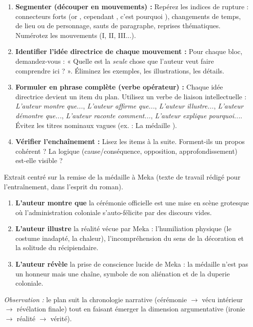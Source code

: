 \documentclass[11pt]{article}
\begin{document}
\begin{methode}
\begin{enumerate}
    \item \textbf{Segmenter (découper en mouvements) :} Repérez les indices de rupture : connecteurs forts (\og or \fg{}, \og cependant \fg{}, \og c'est pourquoi \fg{}), changements de temps, de lieu ou de personnage, sauts de paragraphe, reprises thématiques. Numérotez les mouvements (I, II, III...).
    \item \textbf{Identifier l'idée directrice de chaque mouvement :} Pour chaque bloc, demandez-vous : « Quelle est la \emph{seule} chose que l'auteur veut faire comprendre ici ? ». Éliminez les exemples, les illustrations, les détails.
    \item \textbf{Formuler en phrase complète (verbe opérateur) :} Chaque idée directrice devient un item du plan. Utilisez un verbe de liaison intellectuelle : \emph{L'auteur montre que...}, \emph{L'auteur affirme que...}, \emph{L'auteur illustre...}, \emph{L'auteur démontre que...}, \emph{L'auteur raconte comment...}, \emph{L'auteur explique pourquoi...}. Évitez les titres nominaux vagues (ex. : \og La médaille \fg{}).
    \item \textbf{Vérifier l'enchaînement :} Lisez les items à la suite. Forment-ils un propos cohérent ? La logique (cause/conséquence, opposition, approfondissement) est-elle visible ?
\end{enumerate}
\end{methode}

\begin{exemplebox}
Extrait centré sur la remise de la médaille à Meka (texte de travail rédigé pour l'entraînement, dans l'esprit du roman).
\begin{enumerate}
    \item \textbf{L'auteur montre que} la cérémonie officielle est une mise en scène grotesque où l'administration coloniale s'auto-félicite par des discours vides.
    \item \textbf{L'auteur illustre} la réalité vécue par Meka : l'humiliation physique (le costume inadapté, la chaleur), l'incompréhension du sens de la décoration et la solitude du récipiendaire.
    \item \textbf{L'auteur révèle} la prise de conscience lucide de Meka : la médaille n'est pas un honneur mais une chaîne, symbole de son aliénation et de la duperie coloniale.
\end{enumerate}
\emph{Observation :} le plan suit la chronologie narrative (cérémonie $\rightarrow$ vécu intérieur $\rightarrow$ révélation finale) tout en faisant émerger la dimension argumentative (ironie $\rightarrow$ réalité $\rightarrow$ vérité).
\end{exemplebox}
\end{document}
